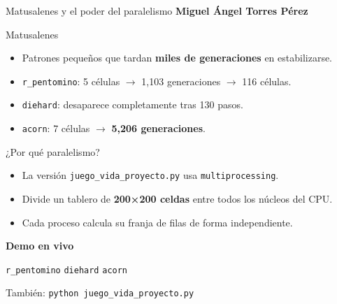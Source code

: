 \documentclass[10pt,aspectratio=169]{beamer}
\newcommand{\demo}[1]{\textcolor{democolor}{\texttt{#1}}}
\begin{document}
\begin{frame}{Matusalenes y el poder del paralelismo}
  \textbf{Miguel Ángel Torres Pérez}

  \vspace{0.4cm}

  \begin{block}{Matusalenes}
    \begin{itemize}
      \item Patrones pequeños que tardan \textbf{miles de generaciones} en estabilizarse.
      \item \texttt{r\_pentomino}: 5 células $\rightarrow$ 1,103 generaciones $\rightarrow$ 116 células.
      \item \texttt{diehard}: desaparece completamente tras 130 pasos.
      \item \texttt{acorn}: 7 células $\rightarrow$ \textbf{5,206 generaciones}.
    \end{itemize}
  \end{block}

  \begin{block}{¿Por qué paralelismo?}
    \begin{itemize}
      \item La versión \texttt{juego\_vida\_proyecto.py} usa \texttt{multiprocessing}.
      \item Divide un tablero de \textbf{200×200 celdas} entre todos los núcleos del CPU.
      \item Cada proceso calcula su franja de filas de forma independiente.
    \end{itemize}
  \end{block}

  \vspace{0.2cm}

  \begin{center}
    \textbf{Demo en vivo}

    \demo{r\_pentomino} \quad \demo{diehard} \quad \demo{acorn}

    \small También: \texttt{python juego\_vida\_proyecto.py}
  \end{center}
\end{frame}
\end{document}

